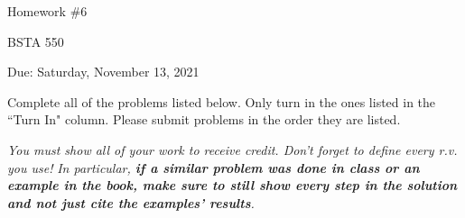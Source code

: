 \documentclass[12pt]{article}
\begin{document}
\begin{center}

Homework \#6

BSTA 550

Due: Saturday, November 13, 2021

%
\bigskip



\end{center}


\bigskip

Complete all of the problems listed below. \newline 
Only turn in the ones listed in the ``Turn In" column. \newline
Please submit problems in the order they are listed.

\bigskip


\textit{You must show all of your work to receive credit. Don't forget to define every r.v. you use!}  \newline 
\textit{In particular, \textbf{if a similar problem was done in class or an example in the book, make sure to still show every step in the solution and not just cite the examples' results}.}  \newline 



\end{document}
